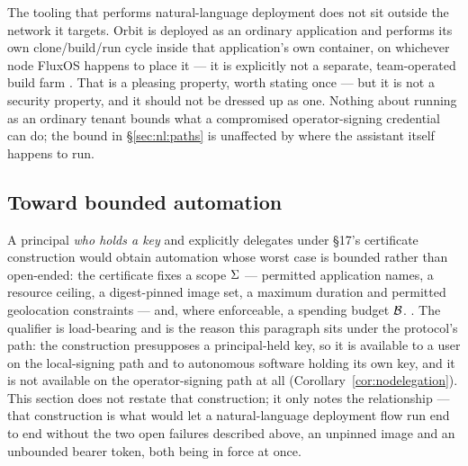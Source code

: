 The tooling that performs natural-language deployment does not sit outside the network
it targets. Orbit is deployed as an ordinary \Flux application and performs its own
clone/build/run cycle inside that application's own container, on whichever node
FluxOS happens to place it — it is explicitly not a separate, team-operated build farm
\shipped {} .  That is a pleasing property, worth
stating once — but it is not a security property, and it should not be dressed up as
one. Nothing about running as an ordinary tenant bounds what a compromised
operator-signing credential can do; the bound in \S\ref{sec:nl:paths} is unaffected by
where the assistant itself happens to run.

\subsection{Toward bounded automation}

A principal \emph{who holds a key} and explicitly delegates under \S17's certificate
construction would obtain automation whose worst case is bounded rather than open-ended:
the certificate fixes a scope \(\Sigma\) — permitted application names, a resource
ceiling, a digest-pinned image set, a maximum duration and permitted geolocation
constraints — and, where enforceable, a spending budget \(\mathcal{B}\). \planned
{}. The qualifier is load-bearing and is
the reason this paragraph sits under the protocol's path: the construction presupposes a
principal-held key, so it is available to a user on the local-signing path and to
autonomous software holding its own key, and it is not available on the operator-signing
path at all (Corollary~\ref{cor:nodelegation}). This section does not restate that
construction; it only notes the relationship — that construction is what would let a
natural-language deployment flow run end to end without the two open failures described
above, an unpinned image and an unbounded bearer token, both being in force at once.

